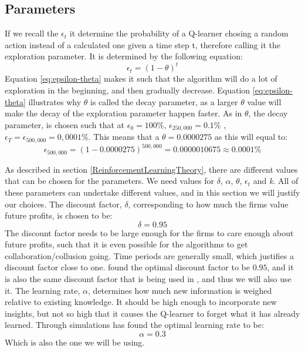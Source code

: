 \documentclass{article}
\begin{document}
\subsection{Parameters}
\label{Parameters}
If we recall the $\epsilon_t$ it determine the probability of a Q-learner chosing a random action instead of a calculated one given a time step t, therefore calling it the exploration parameter. It is determined by the following equation:
\begin{equation}
\label{eq:epsilon-theta}
    \epsilon_t = (1-\theta)^t 
\end{equation}
Equation \ref{eq:epsilon-theta} makes it such that the algorithm will do a lot of exploration in the beginning, and then gradually decrease. Equation \ref{eq:epsilon-theta} illustrates why $\theta$ is called the decay parameter, as a larger $\theta$ value will make the decay of the exploration parameter happen faster. As in \cite{Klein2021}
$\theta$, the decay parameter, is chosen such that at $\epsilon_0 =100\%$,  $\epsilon_{250,000} =0.1\%$ , $\epsilon_T = \epsilon_{500,000}=0,0001\%$. This means that a $\theta=0.0000275$ as this will equal to: \begin{equation}
    \epsilon_{500,000}= (1-0.0000275)^{500,000}=0.0000010675\approx 0.0001\%
\end{equation} 

As described in section \ref{ReinforcementLearningTheory}, there are different values that can be chosen for the parameters. We need values for $\delta$, $\alpha$, $\theta$, $\epsilon_t$ and \textit{k}. All of these parameters can undertake different values, and in this section we will justify our choices.
\newline
The discount factor, $\delta$, corresponding to how much the firms value future profits, is chosen to be: 
$$\delta = 0.95$$
The discount factor needs to be large enough for the firms to care enough about future profits, such that it is even possible for the algorithms to get collaboration/collusion going. Time periods are generally small, which justifies a discount factor close to one. \cite{Klein2021} found the optimal discount factor to be $0.95$, and it is also the same discount factor that is being used in \cite{Calvano}, and thus we will also use it.
\newline
The learning rate, $\alpha$, determines how much new information is weighed relative to existing knowledge. It should be high enough to incorporate new insights, but not so high that it causes the Q-learner to forget what it has already learned. Through simulations \cite{Klein2021} has found the optimal learning rate to be:
$$\alpha = 0.3$$
Which is also the one we will be using.
\end{document}
